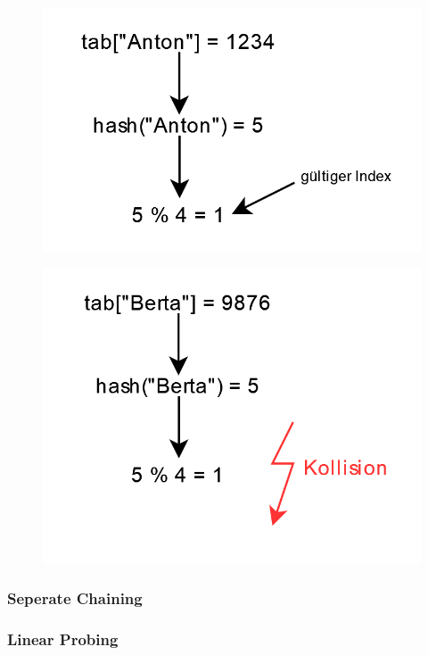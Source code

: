 \documentclass{article}
\begin{document}
\begin{figure}[h!]
  \centering
  \includegraphics[scale=1.2]{hashing_procedure.png}
  \label{fig:hashing_procedure}
\end{figure}
\begin{figure}[h!]
  \centering
  \includegraphics[scale=1.2]{hashing_collision.png}
  \label{fig:hashing_collision}
\end{figure}

\subsubsection{Seperate Chaining}
\subsubsection{Linear Probing}
\end{document}
